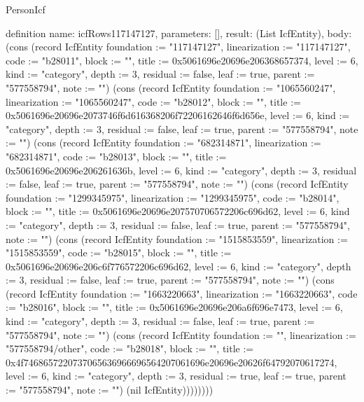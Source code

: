 \begin{lexlean}{PersonIcf}
\begin{semanticmodule}
definition{
  name: icfRows117147127,
  parameters: [],
  result: (List IcfEntity),
  body: (cons (record IcfEntity {foundation := "117147127", linearization := "117147127", code := "b28011", block := "", title := 0x5061696e20696e206368657374, level := 6, kind := "category", depth := 3, residual := false, leaf := true, parent := "577558794", note := ""}) (cons (record IcfEntity {foundation := "1065560247", linearization := "1065560247", code := "b28012", block := "", title := 0x5061696e20696e2073746f6d616368206f72206162646f6d656e, level := 6, kind := "category", depth := 3, residual := false, leaf := true, parent := "577558794", note := ""}) (cons (record IcfEntity {foundation := "682314871", linearization := "682314871", code := "b28013", block := "", title := 0x5061696e20696e206261636b, level := 6, kind := "category", depth := 3, residual := false, leaf := true, parent := "577558794", note := ""}) (cons (record IcfEntity {foundation := "1299345975", linearization := "1299345975", code := "b28014", block := "", title := 0x5061696e20696e207570706572206c696d62, level := 6, kind := "category", depth := 3, residual := false, leaf := true, parent := "577558794", note := ""}) (cons (record IcfEntity {foundation := "1515853559", linearization := "1515853559", code := "b28015", block := "", title := 0x5061696e20696e206c6f776572206c696d62, level := 6, kind := "category", depth := 3, residual := false, leaf := true, parent := "577558794", note := ""}) (cons (record IcfEntity {foundation := "1663220663", linearization := "1663220663", code := "b28016", block := "", title := 0x5061696e20696e206a6f696e7473, level := 6, kind := "category", depth := 3, residual := false, leaf := true, parent := "577558794", note := ""}) (cons (record IcfEntity {foundation := "", linearization := "577558794/other", code := "b28018", block := "", title := 0x4f7468657220737065636966696564207061696e20696e20626f64792070617274, level := 6, kind := "category", depth := 3, residual := true, leaf := true, parent := "577558794", note := ""}) (nil IcfEntity))))))))
}


\end{semanticmodule}
\end{lexlean}
